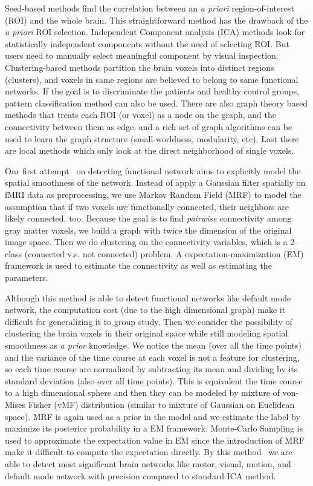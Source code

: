 \documentclass[12pt]{article}
\begin{document}
Seed-based methods find the correlation between an \emph{a priori} region-of-interest (ROI) and the whole brain. This straightforward method has the drawback of the \emph{a priori} ROI selection. Independent Component analysis (ICA) methods look for statistically independent components without the need of selecting ROI. But users need to manually select meaningful component by visual inspection. Clustering-based methods partition the brain voxels into distinct regions (clusters), and voxels in same regions are believed to belong to same functional networks. If the goal is to discriminate the patients and healthy control groups,  pattern classification method can also be used. There are also graph theory based methods that treats each ROI (or  voxel) as a node on the graph, and the connectivity between them as edge, and a rich set of graph algorithms can be used to learn the graph structure (small-worldness, modularity, etc). Last there are local methods which only look at the direct neighborhood of single voxels.

Our first attempt~\cite{SCI:Liu2010a} on detecting functional network aims to explicitly model the spatial smoothness of the network. Instead of apply a Gaussian filter spatially on fMRI data as preprocessing, we use Markov Random Field (MRF) to model the assumption that if two voxels are functionally connected, their neighbors are likely connected, too. Because the goal is to find \emph{pairwise} connectivity among gray matter voxels, we build a graph with twice the dimension of the original image space. Then we do clustering on the connectivity variables, which is a 2-class (connected v.s. not connected) problem. A expectation-maximization (EM) framework is used to estimate the connectivity as well as estimating the parameters.

Although this method is able to detect functional networks like default mode network, the computation cost (due to the high dimensional graph) make it difficult for generalizing it to group study. Then we consider the possibility of clustering the brain voxels in their original space while still modeling spatial smoothness as \emph{a prior} knowledge. We notice the mean (over all the time points) and the variance of the time course at each voxel is not a feature for clustering, so each time course are normalized by subtracting its mean and dividing by its standard deviation (also over all time points). This is equivalent the  time course to a high dimensional sphere and then they can be modeled by mixture of von-Mises Fisher (vMF) distribution (similar to mixture of Gaussian on Euclidean space). MRF is again used as a prior in the model and we estimate the label by maximize its posterior probability in a EM framework. Monte-Carlo Sampling is used to approximate the expectation value in EM since the introduction of MRF make it difficult to compute the expectation directly. By this method~\cite{SCI:Liu2011a} we are able to detect most significant brain networks like motor, visual, motion, and default mode network with precision compared to standard ICA method.
\end{document}

